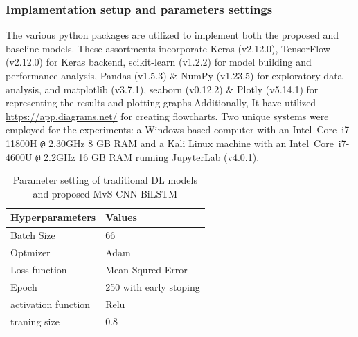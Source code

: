 \documentclass[a4paper,fleqn]{cas-dc}
\begin{document}
\subsubsection{Implamentation setup and parameters settings}
The various python packages are utilized to implement both the proposed and baseline models. These assortments incorporate Keras (v2.12.0), TensorFlow (v2.12.0) for Keras backend, scikit-learn (v1.2.2) for model building and performance analysis, Pandas (v1.5.3) \& NumPy (v1.23.5) for exploratory data analysis, and matplotlib (v3.7.1), seaborn (v0.12.2) \& Plotly (v5.14.1) for representing the results and plotting graphs.Additionally, It have utilized \href{https://app.diagrams.net/}{https://app.diagrams.net/} for creating flowcharts. Two unique systems were employed for the experiments: a Windows-based computer with an Intel\textregistered ~Core\texttrademark ~i7-11800H \texttt{@} 2.30GHz 8 GB RAM and a Kali Linux machine with an Intel\textregistered ~Core\texttrademark ~i7-4600U \texttt{@} 2.2GHz 16 GB RAM running JupyterLab (v4.0.1).


\begin{table}[h!]
  \caption{Parameter setting of traditional DL models and proposed MvS CNN-BiLSTM }
  \label{tab:my-table}
  \begin{tabular}{ll}
  \hline Hyperparameters & Values        \\ \hline
  Batch Size               & 66                     \\
  Optmizer                 & Adam                   \\
  Loss function            & Mean Squred Error      \\
  Epoch                    & 250 with early stoping \\
  activation function      & Relu                   \\
  traning size             & 0.8                   \\ \hline
  \end{tabular}
  \end{table}
\end{document}
